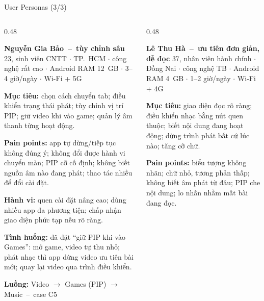 \documentclass[aspectratio=169]{beamer}
\begin{document}
\begin{frame}{User Personas (3/3)}
  \begin{columns}
    \begin{column}{0.48\textwidth}
      \begin{block}{\scriptsize\bfseries Nguyễn Gia Bảo~--~tùy chỉnh sâu}
        {\tiny\color{brandgray} 23, sinh viên CNTT $\cdot$ TP.\ HCM $\cdot$ công nghệ rất cao $\cdot$ Android RAM 12~GB $\cdot$ 3--4 giờ/ngày $\cdot$ Wi-Fi + 5G}\par\vspace{0.6mm}
        {\tiny\textbf{Mục tiêu:} chọn cách chuyển tab; điều khiển trạng thái phát; tùy chỉnh vị trí PIP; giữ video khi vào game; quản lý âm thanh từng hoạt động.}\par\vspace{0.3mm}
        {\tiny\textbf{Pain points:} app tự dừng/tiếp tục không đúng ý; không đổi được hành vi chuyển màn; PIP cỡ cố định; không biết nguồn âm nào đang phát; thao tác nhiều để đổi cài đặt.}\par\vspace{0.3mm}
        {\tiny\textbf{Hành vi:} quen cài đặt nâng cao; dùng nhiều app đa phương tiện; chấp nhận giao diện phức tạp nếu rõ ràng.}\par\vspace{0.3mm}
        {\tiny\textbf{Tình huống:} đã đặt ``giữ PIP khi vào Games'': mở game, video tự thu nhỏ; phát nhạc thì app dừng video ưu tiên bài mới; quay lại video qua trình điều khiển.}\par\vspace{0.3mm}
        {\tiny\textbf{Luồng:} \textcolor{brandteal!60!black}{Video $\rightarrow$ Games (PIP) $\rightarrow$ Music}~--~case C5}
      \end{block}
    \end{column}
    \begin{column}{0.48\textwidth}
      \begin{block}{\scriptsize\bfseries Lê Thu Hà~--~ưu tiên đơn giản, dễ đọc}
        {\tiny\color{brandgray} 37, nhân viên hành chính $\cdot$ Đồng Nai $\cdot$ công nghệ TB $\cdot$ Android RAM 4~GB $\cdot$ 1--2 giờ/ngày $\cdot$ Wi-Fi + 4G}\par\vspace{0.6mm}
        {\tiny\textbf{Mục tiêu:} giao diện đọc rõ ràng; điều khiển nhạc bằng nút quen thuộc; biết nội dung đang hoạt động; dừng trình phát bất cứ lúc nào; tăng cỡ chữ.}\par\vspace{0.3mm}
        {\tiny\textbf{Pain points:} biểu tượng không nhãn; chữ nhỏ, tương phản thấp; không biết âm phát từ đâu; PIP che nội dung; lo nhấn nhầm mất bài đang đọc.}\par\vspace{0.3mm}

\end{block}
\end{column}
\end{columns}
\end{frame}
\end{document}
